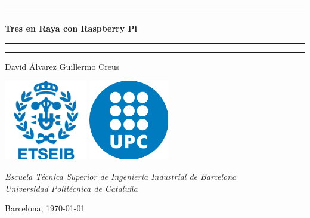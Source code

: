 \documentclass[11pt]{article}
\begin{document}
\begin{titlepage}
  \centering
  \sc \LARGE
  \vspace*{1cm}

  \rule{\textwidth}{1.6pt}\vspace*{-\baselineskip}\vspace*{2pt}
  \rule{\textwidth}{0.4pt}
  \vspace{-.25cm}

  \textbf{Tres en Raya con Raspberry Pi}

  \rule{\textwidth}{0.4pt}\vspace*{-\baselineskip}\vspace*{3.2pt}
  \rule{\textwidth}{1.6pt}
  \vspace{1cm}

  \Large
  David Álvarez \hspace{1cm} Guillermo Creus \\
  \vfill

  \includegraphics[height = 3.5cm]{Logo_ETSEIB.png} \hspace{1cm}
  \includegraphics[height = 3.5cm]{Logo_UPC.png}
  \vspace{1cm}

  \textit{Escuela Técnica Superior de Ingeniería Industrial de Barcelona} \\
  \textit{Universidad Politécnica de Cataluña}
  \vfill

  \large
  Barcelona, \today
\end{titlepage}


\thispagestyle{empty}
\vspace*{\fill}
\tableofcontents
\vfill
\vspace{.75cm}
\newpage
\setcounter{page}{1}
\end{document}
